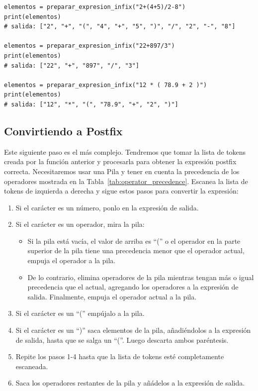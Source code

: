 \documentclass[10pt,a4paper]{article}
\begin{document}
\begin{lstlisting}
elementos = preparar_expresion_infix("2+(4+5)/2-8")
print(elementos)
# salida: ["2", "+", "(", "4", "+", "5", ")", "/", "2", "-", "8"]

elementos = preparar_expresion_infix("22+897/3")
print(elementos)
# salida: ["22", "+", "897", "/", "3"]

elementos = preparar_expresion_infix("12 * ( 78.9 + 2 )")
print(elementos)
# salida: ["12", "*", "(", "78.9", "+", "2", ")"]
\end{lstlisting}

\subsection{Convirtiendo a Postfix}

Este siguiente paso es el más complejo. Tendremos que tomar la lista de tokens creada por la función anterior y procesarla para obtener la expresión postfix correcta. Necesitaremos usar una Pila y tener en cuenta la precedencia de los operadores mostrada en la Tabla~\ref{tab:operator_precedence}. Escanea la lista de tokens de izquierda a derecha y sigue estos pasos para convertir la expresión:

\begin{enumerate}
\item Si el carácter es un número, ponlo en la expresión de salida.
\item Si el carácter es un operador, mira la pila:
    \begin{itemize}
    \item Si la pila está vacía, el valor de arriba es ``('' o el operador en la parte superior de la pila tiene una precedencia menor que el operador actual, empuja el operador a la pila.
    \item De lo contrario, elimina operadores de la pila mientras tengan más o igual precedencia que el actual, agregando los operadores a la expresión de salida. Finalmente, empuja el operador actual a la pila.
    \end{itemize}
\item Si el carácter es un ``('' empújalo a la pila.
\item Si el carácter es un ``)'' saca elementos de la pila, añadiéndolos a la expresión de salida, hasta que se salga un ``(''. Luego descarta ambos paréntesis.
\item Repite los pasos 1-4 hasta que la lista de tokens esté completamente escaneada.
\item Saca los operadores restantes de la pila y añádelos a la expresión de salida.
\end{enumerate}
\end{document}
